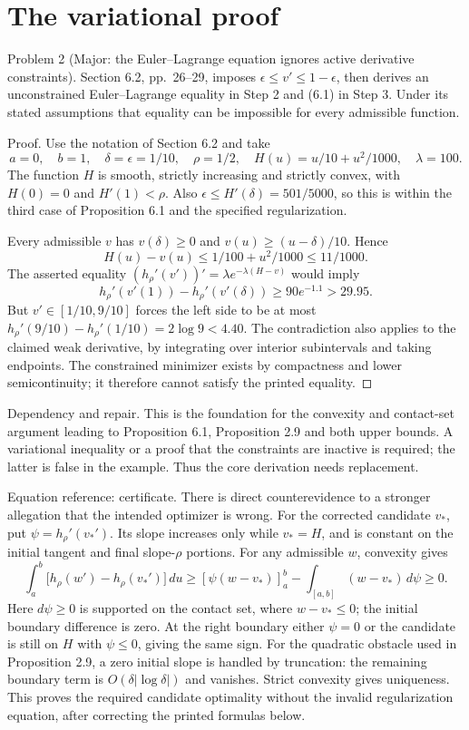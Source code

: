 \documentclass[10pt]{article}
\begin{document}
\section*{The variational proof}
Problem 2 (Major: the Euler–Lagrange equation ignores active derivative constraints).  Section 6.2, pp. 26–29, imposes \(\epsilon\leq v'\leq1-\epsilon\), then derives an unconstrained Euler–Lagrange equality in Step 2 and (6.1) in Step 3. Under its stated assumptions that equality can be impossible for every admissible function.\par
Proof. Use the notation of Section 6.2 and take \[a=0,\quad b=1,\quad \delta=\epsilon=1/10,\quad \rho=1/2,\quad
 H(u)=u/10+u^2/1000,\quad \lambda=100.\] The function \(H\) is smooth, strictly increasing and strictly convex, with \(H(0)=0\) and \(H'(1)<\rho\). Also \(\epsilon\leq H'(\delta)=501/5000\), so this is within the third case of Proposition 6.1 and the specified regularization.\par
Every admissible \(v\) has \(v(\delta)\geq0\) and \(v(u)\geq(u-\delta)/10\). Hence \[H(u)-v(u)\leq 1/100+u^2/1000\leq11/1000.\] The asserted equality \((h_\rho'(v'))'=\lambda e^{-\lambda(H-v)}\) would imply \[h_\rho'(v'(1))-h_\rho'(v'(\delta))
 \geq 90e^{-1.1}>29.95.\] But \(v'\in[1/10,9/10]\) forces the left side to be at most \(h_\rho'(9/10)-h_\rho'(1/10)=2\log9<4.40\). The contradiction also applies to the claimed weak derivative, by integrating over interior subintervals and taking endpoints. The constrained minimizer exists by compactness and lower semicontinuity; it therefore cannot satisfy the printed equality. ◻\par
Dependency and repair. This is the foundation for the convexity and contact-set argument leading to Proposition 6.1, Proposition 2.9 and both upper bounds. A variational inequality or a proof that the constraints are inactive is required; the latter is false in the example. Thus the core derivation needs replacement.\par
Equation reference: certificate. There is direct counterevidence to a stronger allegation that the intended optimizer is wrong. For the corrected candidate \(v_*\), put \(\psi=h_\rho'(v_*')\). Its slope increases only while \(v_*=H\), and is constant on the initial tangent and final slope-\(\rho\) portions. For any admissible \(w\), convexity gives \[
 \int_a^b\!\bigl[h_\rho(w')-h_\rho(v_*')\bigr]\,du
 \geq [\psi(w-v_*)]_a^b-\int_{[a,b]}(w-v_*)\,d\psi\geq0.\] Here \(d\psi\geq0\) is supported on the contact set, where \(w-v_*\leq0\); the initial boundary difference is zero. At the right boundary either \(\psi=0\) or the candidate is still on \(H\) with \(\psi\leq0\), giving the same sign. For the quadratic obstacle used in Proposition 2.9, a zero initial slope is handled by truncation: the remaining boundary term is \(O(\delta|\log\delta|)\) and vanishes. Strict convexity gives uniqueness. This proves the required candidate optimality without the invalid regularization equation, after correcting the printed formulas below.\par
\end{document}
